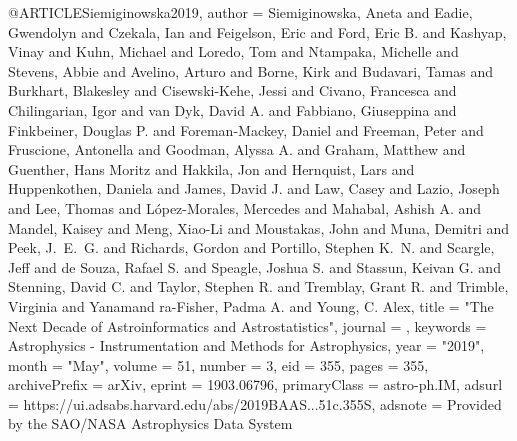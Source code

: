 @ARTICLE{Siemiginowska2019,
       author = {{Siemiginowska}, Aneta and {Eadie}, Gwendolyn and {Czekala}, Ian and
         {Feigelson}, Eric and {Ford}, Eric B. and {Kashyap}, Vinay and
         {Kuhn}, Michael and {Loredo}, Tom and {Ntampaka}, Michelle and
         {Stevens}, Abbie and {Avelino}, Arturo and {Borne}, Kirk and
         {Budavari}, Tamas and {Burkhart}, Blakesley and {Cisewski-Kehe}, Jessi and
         {Civano}, Francesca and {Chilingarian}, Igor and {van Dyk}, David A. and
         {Fabbiano}, Giuseppina and {Finkbeiner}, Douglas P. and
         {Foreman-Mackey}, Daniel and {Freeman}, Peter and
         {Fruscione}, Antonella and {Goodman}, Alyssa A. and {Graham}, Matthew and
         {Guenther}, Hans Moritz and {Hakkila}, Jon and {Hernquist}, Lars and
         {Huppenkothen}, Daniela and {James}, David J. and {Law}, Casey and
         {Lazio}, Joseph and {Lee}, Thomas and {L{\'o}pez-Morales}, Mercedes and
         {Mahabal}, Ashish A. and {Mandel}, Kaisey and {Meng}, Xiao-Li and
         {Moustakas}, John and {Muna}, Demitri and {Peek}, J.~E.~G. and
         {Richards}, Gordon and {Portillo}, Stephen K.~N. and {Scargle}, Jeff and
         {de Souza}, Rafael S. and {Speagle}, Joshua S. and
         {Stassun}, Keivan G. and {Stenning}, David C. and {Taylor}, Stephen R. and
         {Tremblay}, Grant R. and {Trimble}, Virginia and {Yanamand
        ra-Fisher}, Padma A. and {Young}, C. Alex},
        title = "{The Next Decade of Astroinformatics and Astrostatistics}",
      journal = {\baas},
     keywords = {Astrophysics - Instrumentation and Methods for Astrophysics},
         year = "2019",
        month = "May",
       volume = {51},
       number = {3},
          eid = {355},
        pages = {355},
archivePrefix = {arXiv},
       eprint = {1903.06796},
 primaryClass = {astro-ph.IM},
       adsurl = {https://ui.adsabs.harvard.edu/abs/2019BAAS...51c.355S},
      adsnote = {Provided by the SAO/NASA Astrophysics Data System}
}
